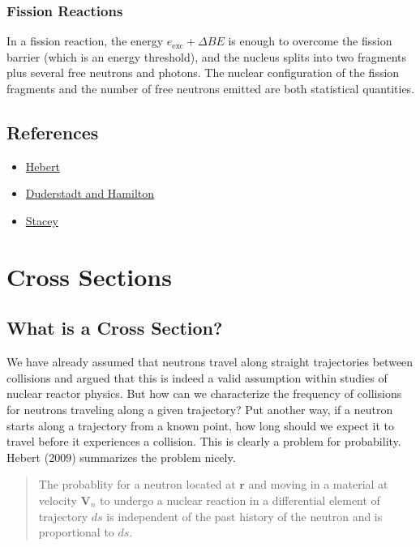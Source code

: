 \documentclass[11pt]{article}
\renewcommand\vec{\mathbf}
\begin{document}
\subsubsection{Fission Reactions}
\label{sec:orgheadline8}
In a fission reaction, the energy \(e_{\text{exc}} + \Delta BE\) is enough to overcome the fission barrier (which is an energy threshold), and the nucleus splits into two fragments plus several free neutrons and photons.  The nuclear configuration of the fission fragments and the number of free neutrons emitted are both statistical quantities.  
\subsection{References}
\label{sec:orgheadline10}
\begin{itemize}
\item \href{Hebert2009}{Hebert}
\item \href{Duderstadt:Hamilton1976}{Duderstadt and Hamilton}
\item \href{Stacey2001}{Stacey}
\end{itemize}

\section{Cross Sections}
\label{sec:orgheadline24}
\subsection{What is a Cross Section?}
\label{sec:orgheadline12}
We have already assumed that neutrons travel along straight trajectories between collisions and argued that this is indeed a valid assumption within studies of nuclear reactor physics.  But how can we characterize the frequency of collisions for neutrons traveling along a given trajectory?  Put another way, if a neutron starts along a trajectory from a known point, how long should we expect it to travel before it experiences a collision.  This is clearly a problem for probability.  Hebert (2009) summarizes the problem nicely.

\begin{quote}
The probablity for a neutron located at \(\vec{r}\) and moving in a material at velocity \(\vec{V}_n\) to undergo a nuclear reaction in a differential element of trajectory \(ds\) is independent of the past history of the neutron and is proportional to \(ds\).
\end{quote}
\end{document}
